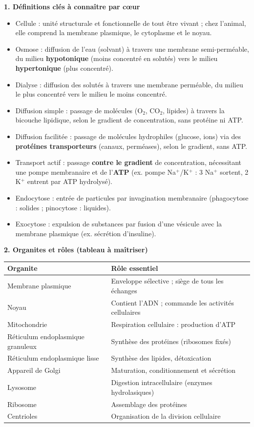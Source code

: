 \documentclass[11pt]{article}
\newcommand{\cle}[1]{{\popxbold\color{popdark}#1}}
\begin{document}
\begin{bilan}
\textbf{1. Définitions clés à connaître par c\oe ur}
\begin{itemize}
  \item \cle{Cellule} : unité structurale et fonctionnelle de tout être vivant ; chez l'animal, elle comprend la \cle{membrane plasmique}, le \cle{cytoplasme} et le \cle{noyau}.
  \item \cle{Osmose} : diffusion de l'eau (solvant) à travers une membrane semi-perméable, du milieu \textbf{hypotonique} (moins concentré en solutés) vers le milieu \textbf{hypertonique} (plus concentré).
  \item \cle{Dialyse} : diffusion des solutés à travers une membrane perméable, du milieu le plus concentré vers le milieu le moins concentré.
  \item \cle{Diffusion simple} : passage de molécules (O$_2$, CO$_2$, lipides) à travers la bicouche lipidique, selon le gradient de concentration, sans protéine ni ATP.
  \item \cle{Diffusion facilitée} : passage de molécules hydrophiles (glucose, ions) via des \textbf{protéines transporteurs} (canaux, perméases), selon le gradient, sans ATP.
  \item \cle{Transport actif} : passage \textbf{contre le gradient} de concentration, nécessitant une pompe membranaire et de l'\textbf{ATP} (ex. pompe Na$^+$/K$^+$ : 3 Na$^+$ sortent, 2 K$^+$ entrent par ATP hydrolysé).
  \item \cle{Endocytose} : entrée de particules par invagination membranaire (phagocytose : solides ; pinocytose : liquides).
  \item \cle{Exocytose} : expulsion de substances par fusion d'une vésicule avec la membrane plasmique (ex. sécrétion d'insuline).
\end{itemize}

\textbf{2. Organites et rôles (tableau à maîtriser)}
\begin{center}
\begin{tabularx}{\linewidth}{|l|X|}\hline
\rowcolor{popblueL} \textbf{Organite} & \textbf{Rôle essentiel} \\ \hline
Membrane plasmique & Enveloppe sélective ; siège de tous les échanges \\ \hline
Noyau & Contient l'ADN ; commande les activités cellulaires \\ \hline
Mitochondrie & Respiration cellulaire : production d'ATP \\ \hline
Réticulum endoplasmique granuleux & Synthèse des protéines (ribosomes fixés) \\ \hline
Réticulum endoplasmique lisse & Synthèse des lipides, détoxication \\ \hline
Appareil de Golgi & Maturation, conditionnement et sécrétion \\ \hline
Lysosome & Digestion intracellulaire (enzymes hydrolasiques) \\ \hline
Ribosome & Assemblage des protéines \\ \hline
Centrioles & Organisation de la division cellulaire \\ \hline
\end{tabularx}
\end{center}


\end{bilan}
\end{document}
